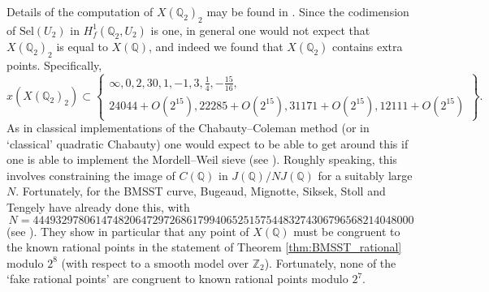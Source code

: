\documentclass[11pt]{amsart}
\def\Z{\mathbb Z}
\def\Q{\mathbb Q}
\theoremstyle{plain}
\theoremstyle{definition}
\newcommand{\Mat}{\mathrm{Mat}}
\newcommand{\Sym}{\mathrm{Sym}}
\newcommand{\Sel}{\mathrm{Sel}}
\newcommand{\Res}{\mathrm{Res}}
\begin{document}
%

Details of the computation of $X(\Q _2 )_2$ may be found in \cite{BKC}. Since the codimension of $\Sel (U_2 )$ in $H^1 _f (\Q _2 ,U_2 )$ is one, in general one would not expect that $X(\Q _2 )_2$ is equal to $X(\Q )$, and indeed we found that $X(\Q _2 )$ contains extra points. Specifically, 
\[
x(X(\Q _2 )_2 ) \subset \left\{  \begin{array}{c}\infty ,0,2,30,1,-1,3,\frac{1}{4},-\frac{15}{16}, \\  24044 +O(2^{15}),22285+O(2^{15}),31171+O(2^{15}),12111+O(2^{15}) \end{array}\right\}.
\]
As in classical implementations of the Chabauty--Coleman method (or in `classical' quadratic Chabauty) one would expect to be able to get around this if one is able to implement the Mordell--Weil sieve (see \cite{BS10}). Roughly speaking, this involves constraining the image of $C(\Q )$ in $J(\Q )/NJ(\Q )$ for a suitably large $N$. Fortunately, for the BMSST curve, Bugeaud, Mignotte, Siksek, Stoll and Tengely have already done this, with \[
N=4449329780614748206472972686179940652515754483274306796568214048000
\]
 (see \cite[\S 10]{BMSST}). They show in particular that any point of $X(\Q )$ must be congruent to the known rational points in the statement of Theorem \ref{thm:BMSST_rational} modulo $2^8$ (with respect to a smooth model over $\Z _2 $). Fortunately, none of the `fake rational points' are congruent to known rational points modulo $2^7$. 
% 
\end{document}
